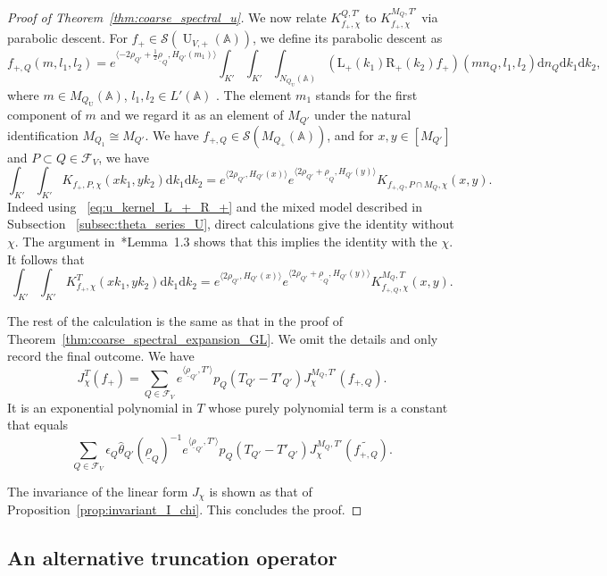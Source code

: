\documentclass[letterpaper,11pt]{amsart}
\newcommand{\bA}{\mathbb{A}}
\newcommand{\cF}{\mathcal{F}}
\newcommand{\cS}{\mathcal{S}}
\newcommand{\rd}{\mathrm{d}}
\newcommand{\<}{\negthickspace}
\DeclareMathOperator{\U}{U}
\theoremstyle{definition}
\theoremstyle{plain}
\theoremstyle{remark}
\numberwithin{equation}{section}
\begin{document}
\begin{proof}[Proof of Theorem~\ref{thm:coarse_spectral_u}]
We now relate $K_{f_+,\chi}^{Q,T'}$ to $K_{f_+,\chi}^{M_Q,T'}$ via parabolic
descent. For $f_+ \in \cS(\U_{V,+}(\bA))$, we define its parabolic descent as
    \[
    f_{+, Q}(m, l_1, l_2) =
    e^{\langle -2 \rho_{Q'} + \frac 12 \underline{\rho}_Q  ,H_{Q'}(m_1) \rangle}
    \int_{K'} \int_{K'} \int_{N_{Q_{\U}}(\bA)}
    \left( \mathrm{L}_+(k_1)\mathrm{R}_+(k_2)
    f_+ \right)(m n_Q, l_1, l_2) \rd n_Q \rd k_1 \rd k_2,
    \]
where $m \in M_{Q_{\U}}(\bA)$, $l_1, l_2 \in L'(\bA)$ . The element $m_1$ stands for the first component of $m$ and we regard it as an element of $M_{Q'}$ under the natural identification $M_{Q_1} \cong M_{Q'}$. We have $f_{+,Q} \in
\cS(M_{Q_+}(\bA))$, and for $x, y \in [M_{Q'}]$ and $P \subset Q\in \cF_V$, we
have
    \[
    \int_{K'} \int_{K'} K_{f_+,P, \chi}(x k_1, y k_2) \rd k_1 \rd k_2
    =e^{ \langle  2 \rho_{Q'}  , H_{Q'}(x) \rangle}
    e^{ \langle  2 \rho_{Q'} + \underline{\rho}_Q , H_{Q'}(y) \rangle}
    K_{f_{+,Q}, P \cap M_Q, \chi}(x, y).
    \]
Indeed using ~\eqref{eq:u_kernel_L_+_R_+} and the mixed model described in Subsection ~\ref{subsec:theta_series_U}, direct calculations give the identity without $\chi$. The argument
in~\cite{Zydor3}*{Lemma~1.3} shows that this implies the identity with the
$\chi$. It follows that
    \[
    \int_{K'} \int_{K'} K^T_{f_+,\chi}(x k_1, y k_2) \rd k_1 \rd k_2
    = e^{ \langle   2 \rho_{Q'} , H_{Q'}(x) \rangle}
    e^{ \langle  2 \rho_{Q'}  +  \underline{\rho}_Q , H_{Q'}(y) \rangle}
    K_{f_{+,Q},\chi}^{M_Q, T}(x, y).
    \]

The rest of the calculation is the same as that in the proof of
Theorem~\ref{thm:coarse_spectral_expansion_GL}. We omit the details and only record the final
outcome. We have
    \[
    J_\chi^T(f_+) = \sum_{Q \in \cF_V}
    e^{ \langle \underline{\rho}_{Q'},T'\rangle}
    p_Q(T_{Q'}-T'_{Q'}) J_\chi^{M_Q,T'}(f_{+,Q}).
    \]
It is an exponential polynomial in $T$ whose purely polynomial term is a constant that equals
    \[
    \sum_{Q \in \cF_V}  \epsilon_{Q}
    \widehat{\theta}_{Q'}(\underline{\rho}_Q)^{-1}
    e^{ \langle \underline{\rho}_{Q'},T'\rangle}
    p_Q(T_{Q'}-T'_{Q'}) J_\chi^{M_Q,T'}(\widetilde{f_{+,Q}}).
    \]

The invariance of the linear form $J_\chi$ is shown as that of
Proposition~\ref{prop:invariant_I_chi}. This concludes the proof.
\end{proof}




\subsection{An alternative truncation operator}
\label{sec:truncation_IY}
\end{document}
